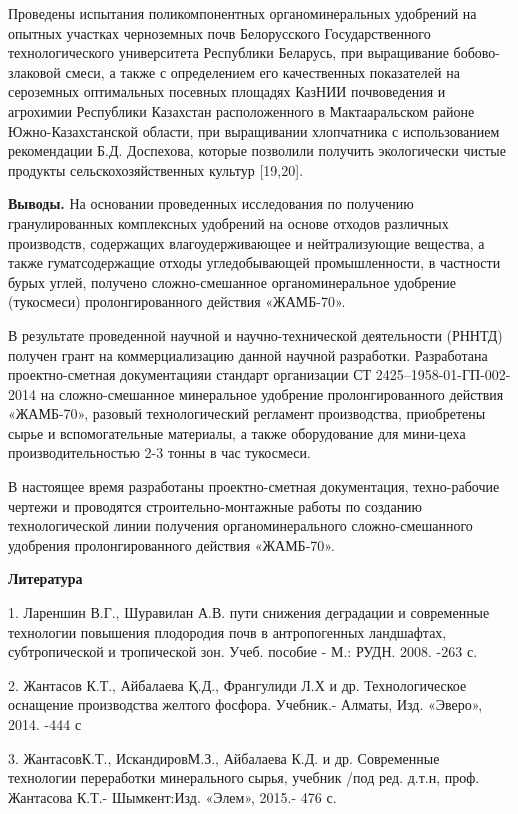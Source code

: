 Проведены испытания поликомпонентных органоминеральных удобрений на
опытных участках черноземных почв Белорусского Государственного
технологического университета Республики Беларусь, при выращивание
бобово-злаковой смеси, а также с определением его качественных
показателей на сероземных оптимальных посевных площадях КазНИИ
почвоведения и агрохимии Республики Казахстан расположенного в
Мактааральском районе Южно-Казахстанской области, при выращивании
хлопчатника с использованием рекомендации Б.Д. Доспехова, которые
позволили получить экологически чистые продукты сельскохозяйственных
культур {[}19,20{]}.

\textbf{Выводы.} На основании проведенных исследования по получению
гранулированных комплексных удобрений на основе отходов различных
производств, содержащих влагоудерживающее и нейтрализующие вещества, а
также гуматсодержащие отходы угледобывающей промышленности, в частности
бурых углей, получено сложно-смешанное органоминеральное удобрение
(тукосмеси) пролонгированного действия «ЖАМБ-70».

В результате проведенной научной и научно-технической деятельности
(РННТД) получен грант на коммерциализацию данной научной разработки.
Разработана проектно-сметная документацияи стандарт организации СТ
2425--1958-01-ГП-002-2014 на сложно-смешанное минеральное удобрение
пролонгированного действия «ЖАМБ-70», разовый технологический регламент
производства, приобретены сырье и вспомогательные материалы, а также
оборудование для мини-цеха производительностью 2-3 тонны в час
тукосмеси.

В настоящее время разработаны проектно-сметная документация,
техно-рабочие чертежи и проводятся строительно-монтажные работы по
созданию технологической линии получения органоминерального
сложно-смешанного удобрения пролонгированного действия «ЖАМБ-70».

\textbf{Литература}

1. Лареншин В.Г., Шуравилан А.В. пути снижения деградации и современные
технологии повышения плодородия почв в антропогенных ландшафтах,
субтропической и тропической зон. Учеб. пособие - М.: РУДН. 2008. -263
с.

2. Жантасов К.Т., Айбалаева Қ.Д., Франгулиди Л.Х и др. Технологическое
оснащение производства желтого фосфора. Учебник.- Алматы, Изд. «Эверо»,
2014. -444 с

3. ЖантасовК.Т., ИскандировМ.З., Айбалаева К.Д. и др. Современные
технологии переработки минерального сырья, учебник /под ред. д.т.н,
проф. Жантасова К.Т.- Шымкент:Изд. «Элем», 2015.- 476 с.


